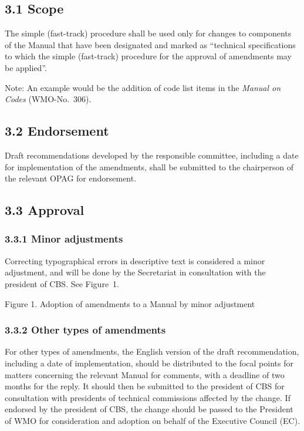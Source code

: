 \hypertarget{scope}{%
\subsection{3.1 Scope}\label{scope}}

The simple (fast-track) procedure shall be used only for changes to components of the Manual that have been designated and marked as ``technical specifications to which the simple (fast-track) procedure for the approval of amendments may be applied''.

Note: An example would be the addition of code list items in the \emph{Manual on Codes} (WMO-No.~306).

\hypertarget{endorsement}{%
\subsection{3.2 Endorsement}\label{endorsement}}

Draft recommendations developed by the responsible committee, including a date for implementation of the amendments, shall be submitted to the chairperson of the relevant OPAG for endorsement.

\hypertarget{approval}{%
\subsection{3.3 Approval}\label{approval}}

\hypertarget{minor-adjustments}{%
\subsubsection{3.3.1 Minor adjustments}\label{minor-adjustments}}

Correcting typographical errors in descriptive text is considered a minor adjustment, and will be done by the Secretariat in consultation with the president of CBS. See Figure~1.

Figure 1. Adoption of amendments to a Manual by minor adjustment

\hypertarget{other-types-of-amendments}{%
\subsubsection{3.3.2 Other types of amendments}\label{other-types-of-amendments}}

For other types of amendments, the English version of the draft recommendation, including a date of implementation, should be distributed to the focal points for matters concerning the relevant Manual for comments, with a deadline of two months for the reply. It should then be submitted to the president of CBS for consultation with presidents of technical commissions affected by the change. If endorsed by the president of CBS, the change should be passed to the President of WMO for consideration and adoption on behalf of the Executive Council (EC).

